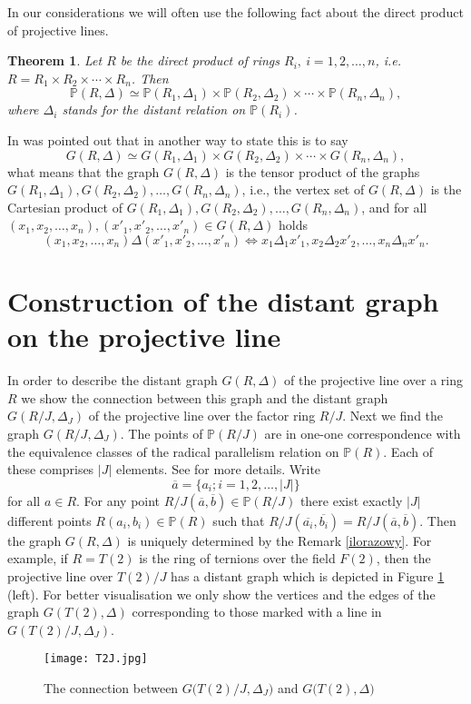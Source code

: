 \documentclass[12pt,a4paper]{article}
\newtheorem{theorem}{Theorem}
\theoremstyle{definition}
\begin{document}
In our considerations we will often use the following fact about the direct product of projective lines.
\begin{theorem} \label{product}{\rm \cite[6.1.]{hav3}}
Let $R$ be the direct product of rings $R_i, \ i=1, 2, \ldots, n$, i.e. $R=R_1\times R_2\times \cdots \times R_n$. 
Then
$$
\mathbb{P}(R, \Delta)\simeq \mathbb{P}(R_1, \Delta_1)\times \mathbb{P}(R_2, \Delta_2)\times \cdots \times \mathbb{P}(R_n, \Delta_n),
$$
where $\Delta_i$ stands for the distant relation on $\mathbb{P}(R_i)$.
\end{theorem}

In \cite{ja} was pointed out that in another way to state this is to say
$$
G(R, \Delta)\simeq G(R_1, \Delta_1)\times G(R_2, \Delta_2)\times \cdots \times G(R_n, \Delta_n),
$$ 
what means that the graph $G(R, \Delta)$ is the tensor product of the graphs\break $G(R_1, \Delta_1), G(R_2, \Delta_2), \ldots, G(R_n, \Delta_n)$, i.e., the vertex set of $G(R, \Delta)$ is the Cartesian product of $G(R_1, \Delta_1), G(R_2, \Delta_2), \ldots, G(R_n, \Delta_n)$, and for all\break $(x_1, x_2, \ldots, x_n), (x'_1, x'_2, \ldots, x'_n)\in G(R, \Delta)$ holds
$$(x_1, x_2, \ldots, x_n)\Delta (x'_1, x'_2, \ldots, x'_n)\Leftrightarrow x_1\Delta_1 x'_1, x_2\Delta_2 x'_2, \ldots, x_n\Delta_n x'_n.$$ 

\section{Construction of the distant graph on the projective line}
\label{construction}

In order to describe the distant graph $G(R, \Delta)$ of the projective line over a ring $R$ we show the connection between this graph and the distant graph $G(R/J, \Delta_J)$ of the projective line over the factor ring $R/J$. Next we find the graph $G(R/J, \Delta_J)$.\newline
The points of $\mathbb{P}(R/J)$ are in one-one correspondence with the equivalence classes of the radical parallelism relation on $\mathbb{P}(R)$. Each of these comprises $|J|$ elements. See \cite{radical} for more details.
Write $$\overline{a}=\{a_i; i=1, 2, \ldots, |J|\}$$ for all $a\in R$. For any point $R/J(\overline{a}, \overline{b})\in \mathbb{P}(R/J)$ there exist exactly $|J|$ different points $R(a_i, b_i)\in \mathbb{P}(R)$ such that $R/J(\overline{a_i}, \overline{b_i})=R/J(\overline{a}, \overline{b})$. 
Then the graph $G(R, \Delta)$ is uniquely determined by the Remark \ref{ilorazowy}.
For example, if $R=T(2)$ is the ring of ternions over the field $F(2)$, then the projective line over $T(2)/J$ has a distant graph which is depicted in Figure \ref{a} (left). For better visualisation we only show the vertices and the edges of the graph $G(T(2), \Delta)$ corresponding to those marked with a line in $G(T(2)/J, \Delta_J)$.\break
\begin{figure}[hhh]
\centerline{\texttt{[image: T2J.jpg]}}
\caption{The connection between $G\big(T(2)/J, \Delta_J\big)$ and  $G\big(T(2), \Delta\big)$}
\label{a}
\end{figure}
\end{document}
